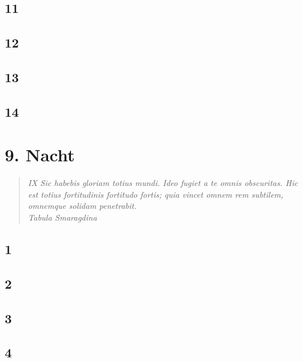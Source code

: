 \documentclass[11pt,titlepage,a5paper]{book}
\begin{document}
\section*{11}

\section*{12}

\section*{13}

\section*{14}

\chapter*{9. Nacht}

\begin{quotation}

\emph{IX Sic habebis gloriam totius mundi. Ideo fugiet a te omnis obscuritas. Hic est totius fortitudinis fortitudo fortis; quia vincet omnem rem subtilem, omnemque solidam penetrabit.  \\Tabula Smaragdina}

\end{quotation}

\section*{1}

\section*{2}

\section*{3}

\section*{4}
\end{document}
